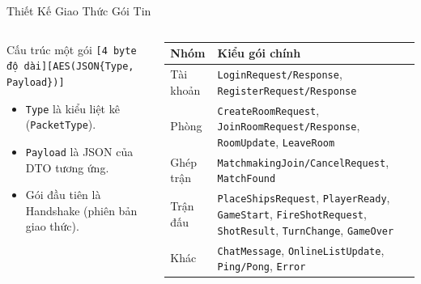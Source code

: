 \begin{frame}{Thiết Kế Giao Thức Gói Tin}
  \footnotesize
  \begin{columns}[T]
    \begin{column}{0.46\textwidth}
      \begin{block}{Cấu trúc một gói}
        \texttt{[4 byte độ dài][AES(JSON\{Type, Payload\})]}
        \begin{itemize}\setlength{\itemsep}{0pt}
          \item \texttt{Type} là kiểu liệt kê (\texttt{PacketType}).
          \item \texttt{Payload} là JSON của DTO tương ứng.
          \item Gói đầu tiên là Handshake (phiên bản giao thức).
        \end{itemize}
      \end{block}
    \end{column}
    \begin{column}{0.5\textwidth}
      \begin{tabularx}{\textwidth}{@{}lY@{}}
        \toprule \textbf{Nhóm} & \textbf{Kiểu gói chính} \\ \midrule
        Tài khoản & \texttt{LoginRequest/Response}, \texttt{RegisterRequest/Response} \\
        Phòng & \texttt{CreateRoomRequest}, \texttt{JoinRoomRequest/Response}, \texttt{RoomUpdate}, \texttt{LeaveRoom} \\
        Ghép trận & \texttt{MatchmakingJoin/CancelRequest}, \texttt{MatchFound} \\
        Trận đấu & \texttt{PlaceShipsRequest}, \texttt{PlayerReady}, \texttt{GameStart}, \texttt{FireShotRequest}, \texttt{ShotResult}, \texttt{TurnChange}, \texttt{GameOver} \\
        Khác & \texttt{ChatMessage}, \texttt{OnlineListUpdate}, \texttt{Ping/Pong}, \texttt{Error} \\
        \bottomrule
      \end{tabularx}
    \end{column}
  \end{columns}
\end{frame}

